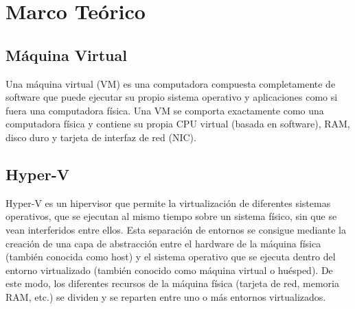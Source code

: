 \documentclass[preprint,12pt]{elsarticle}
\begin{document}



\section{Marco Teórico}


\subsection {\textbf{Máquina Virtual}}
Una máquina virtual (VM) es una computadora compuesta completamente de software que puede ejecutar su propio sistema operativo y aplicaciones como si fuera una computadora física. Una VM se comporta exactamente como una computadora física y contiene su propia CPU virtual (basada en software), RAM, disco duro y tarjeta de interfaz de red (NIC).\cite{Citrix2018}


\subsection {\textbf{Hyper-V}}
Hyper-V es un hipervisor que permite la virtualización de diferentes sistemas operativos, que se ejecutan al mismo tiempo sobre un sistema físico, sin que se vean interferidos entre ellos. Esta separación de entornos se consigue mediante la creación de una capa de abstracción entre el hardware de la máquina física (también conocida como host) y el sistema operativo que se ejecuta dentro del entorno virtualizado (también conocido como máquina virtual o huésped). De este modo, los diferentes recursos de la máquina física (tarjeta de red, memoria RAM, etc.) se dividen y se reparten entre uno o más entornos virtualizados.
\end{document}
